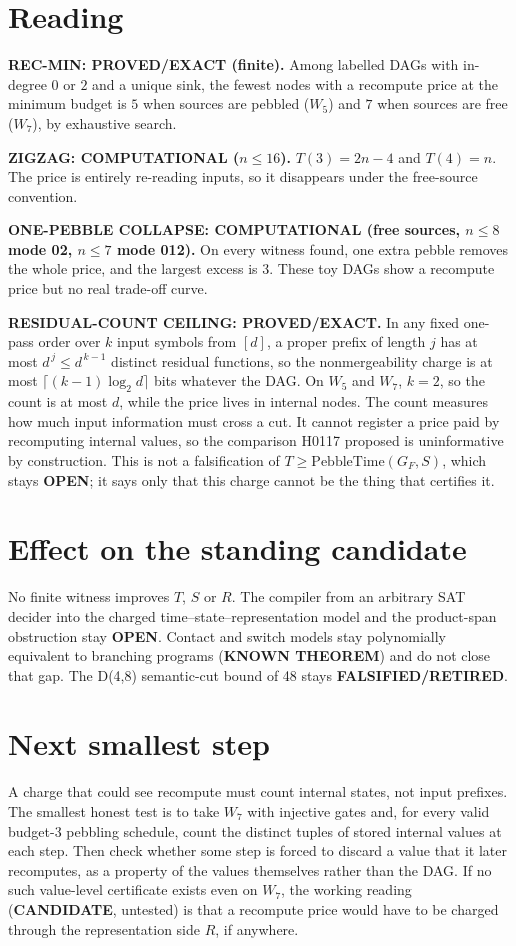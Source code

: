 \documentclass[11pt]{article}
\begin{document}
\section*{Reading}
\textbf{REC-MIN: PROVED/EXACT (finite).} Among labelled DAGs with in-degree $0$ or $2$ and a unique sink, the fewest nodes with a recompute price at the minimum budget is $5$ when sources are pebbled ($W_5$) and $7$ when sources are free ($W_7$), by exhaustive search.

\textbf{ZIGZAG: COMPUTATIONAL ($n\le16$).} $T(3)=2n-4$ and $T(4)=n$. The price is entirely re-reading inputs, so it disappears under the free-source convention.

\textbf{ONE-PEBBLE COLLAPSE: COMPUTATIONAL (free sources, $n\le8$ mode 02, $n\le7$ mode 012).} On every witness found, one extra pebble removes the whole price, and the largest excess is $3$. These toy DAGs show a recompute price but no real trade-off curve.

\textbf{RESIDUAL-COUNT CEILING: PROVED/EXACT.} In any fixed one-pass order over $k$ input symbols from $[d]$, a proper prefix of length $j$ has at most $d^{\,j}\le d^{\,k-1}$ distinct residual functions, so the nonmergeability charge is at most $\lceil(k-1)\log_2d\rceil$ bits whatever the DAG. On $W_5$ and $W_7$, $k=2$, so the count is at most $d$, while the price lives in internal nodes. The count measures how much input information must cross a cut. It cannot register a price paid by recomputing internal values, so the comparison H0117 proposed is uninformative by construction. This is not a falsification of $T\ge\mathrm{PebbleTime}(G_F,S)$, which stays \textbf{OPEN}; it says only that this charge cannot be the thing that certifies it.

\section*{Effect on the standing candidate}
No finite witness improves $T$, $S$ or $R$. The compiler from an arbitrary SAT decider into the charged time--state--representation model and the product-span obstruction stay \textbf{OPEN}. Contact and switch models stay polynomially equivalent to branching programs (\textbf{KNOWN THEOREM}) and do not close that gap. The D(4,8) semantic-cut bound of 48 stays \textbf{FALSIFIED/RETIRED}.

\section*{Next smallest step}
A charge that could see recompute must count internal states, not input prefixes. The smallest honest test is to take $W_7$ with injective gates and, for every valid budget-$3$ pebbling schedule, count the distinct tuples of stored internal values at each step. Then check whether some step is forced to discard a value that it later recomputes, as a property of the values themselves rather than the DAG. If no such value-level certificate exists even on $W_7$, the working reading (\textbf{CANDIDATE}, untested) is that a recompute price would have to be charged through the representation side $R$, if anywhere.
\end{document}
